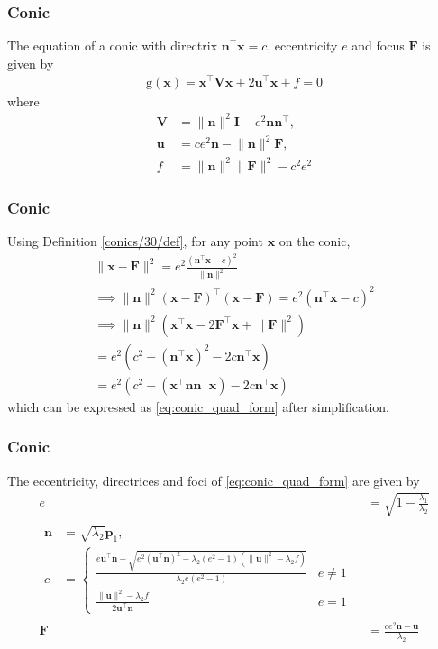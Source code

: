 \documentclass{beamer}
\providecommand{\brak}[1]{\ensuremath{\left(#1\right)}}
\theoremstyle{remark}
\providecommand{\norm}[1]{\lVert#1\rVert}
\let\vec\mathbf
\begin{document}
\begin{frame}
\frametitle{Conic}
The equation of  a conic with directrix $\vec{n}^{\top}\vec{x} = c$, eccentricity $e$ and focus $\vec{F}$ is given by 
\begin{align}
	\text{g}\brak{\vec{x}} = \vec{x}^{\top}\vec{V}\vec{x}+2\vec{u}^{\top}\vec{x}+f=0
    \end{align}
where     
\begin{align}
  \label{eq:conic_quad_form_v}
\vec{V} &=\norm{\vec{n}}^2\vec{I}-e^2\vec{n}\vec{n}^{\top}, 
\\
\label{eq:conic_quad_form_u}
\vec{u} &= ce^2\vec{n}-\norm{\vec{n}}^2\vec{F}, 
\\
\label{eq:conic_quad_form_f}
f &= \norm{\vec{n}}^2\norm{\vec{F}}^2-c^2e^2
    \end{align}
\end{frame}
\begin{frame}
\frametitle{Conic}
  Using Definition \ref{conics/30/def},
for any point $\vec{x}$ on the conic,
\begin{multline}
\norm{\vec{x}-\vec{F}}^2=e^2 \frac{\brak{{\vec{n}^{\top}\vec{x} - c}}^2}{\norm{\vec{n}}^2}\label{conics/30/eq:1} \\
\implies \norm{\vec{n}}^2\brak{\vec{x}-\vec{F}}^{\top}\brak{\vec{x}-\vec{F}}=e^2\brak{\vec{n}^{\top}\vec{x} - c}^2
\\
\implies \norm{\vec{n}}^2\brak{\vec{x}^{\top}\vec{x}-2\vec{F}^{\top}\vec{x}+\norm{\vec{F}}^2}
	\\
	=e^2\brak{c^2+\brak{\vec{n}^{\top}\vec{x} }^2-2c\vec{n}^{\top}\vec{x}} \\
=e^2\brak{c^2+\brak{\vec{x}^{\top}\vec{n}\vec{n}^{\top}\vec{x} }-2c\vec{n}^{\top}\vec{x}}
\end{multline}
%
which can be expressed as \eqref{eq:conic_quad_form} after simplification.
\end{frame}
\begin{frame}
\frametitle{Conic}
  The eccentricity, directrices and foci of \eqref{eq:conic_quad_form} are given by 
\begin{align}
  \label{eq:conic_quad_form_e} 
  e&= \sqrt{1-\frac{\lambda_1}{\lambda_2}}
\\
\label{eq:conic_quad_form_nc} 
	\begin{split}
  \vec{n}&= \sqrt{\lambda_2}\vec{p}_1,  
  \\
	c &= 
  \begin{cases}
    \frac{e\vec{u}^{\top}\vec{n} \pm \sqrt{e^2\brak{\vec{u}^{\top}\vec{n}}^2-\lambda_2\brak{e^2-1}\brak{\norm{\vec{u}}^2 - \lambda_2 f}}}{\lambda_2e\brak{e^2-1}} & e \ne 1
    \\
    \frac{\norm{\vec{u}}^2 - \lambda_2 f   }{2\vec{u}^{\top}\vec{n}} & e = 1
  \end{cases}
	\end{split}
  \\
  \label{eq:conic_quad_form_F} 
  \vec{F}  &= \frac{ce^2\vec{n}-\vec{u}}{\lambda_2}
\end{align}  
\end{frame}
\end{document}
